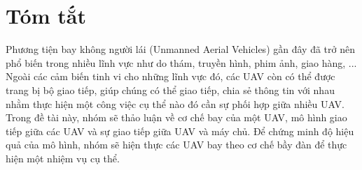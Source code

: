 \cleardoublepage
\chapter*{Tóm tắt}
\vspace{1.0cm}
Phương tiện bay không người lái (Unmanned Aerial Vehicles) gần đây đã trở nên phổ biến trong nhiều lĩnh vực như do thám, truyền hình, phim ảnh, giao hàng, ... Ngoài các cảm biến tinh vi  cho những lĩnh vực đó, các UAV còn có thể được trang bị bộ giao tiếp, giúp chúng có thể giao tiếp, chia sẻ thông tin với nhau nhằm thực hiện một công việc cụ thể nào đó cần sự phối hợp giữa nhiều UAV. Trong đề tài này, nhóm sẽ thảo luận về cơ chế bay của một UAV, mô hình giao tiếp giữa các UAV và sự giao tiếp giữa UAV và máy chủ. Để chứng minh độ hiệu quả của mô hình, nhóm sẽ hiện thực các UAV bay theo cơ chế bầy đàn để thực hiện một nhiệm vụ cụ thể.





\vskip0.5cm



